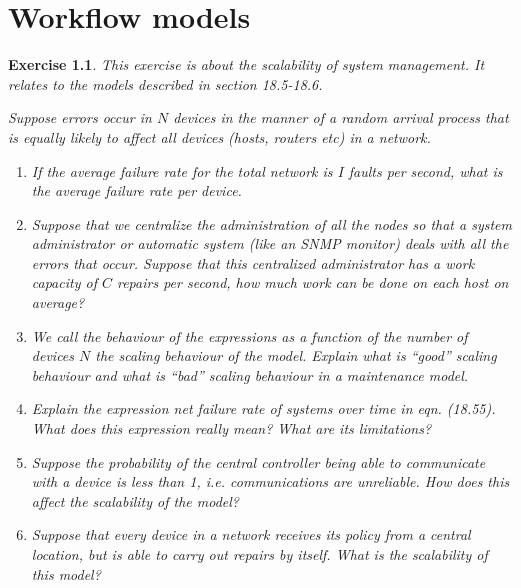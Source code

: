 \documentclass{book}
\newtheorem{exercise}{Exercise}
\begin{document}
\chapter{Workflow models}

\begin{exercise} 
This exercise is about the scalability of system management. It relates to the models
described in section 18.5-18.6.

Suppose errors occur in $N$ devices in the manner of a random arrival process that
is equally likely to affect all devices (hosts, routers etc) in a network.
\begin{enumerate}
\item If the average failure rate for the total network is $I$ faults per second, what
is the average failure rate {\em per device}.
\item Suppose that we centralize the administration of all the nodes so that a system
administrator or automatic system (like an SNMP monitor) deals with all the errors that occur.
Suppose that this centralized administrator has a work capacity of $C$ repairs per second,
how much work can be done on each host on average?

\item We call the behaviour of the expressions as a function of the number of devices $N$
the scaling behaviour of the model. Explain what is ``good'' scaling behaviour
and what is ``bad'' scaling behaviour in a maintenance model.

\item Explain the expression net failure rate of systems over time in eqn. (18.55).
What does this expression really mean? What are its limitations?

\item Suppose the probability of the central controller being able to communicate with a device
is less than 1, i.e. communications are unreliable. How does this affect the scalability of the
model?

\item Suppose that every device in a network receives its policy from a central
location, but is able to carry out repairs by itself. What is the scalability of this
model?
\end{enumerate}
\end{exercise} 
\begin{solution}
\end{solution}
\end{document}
